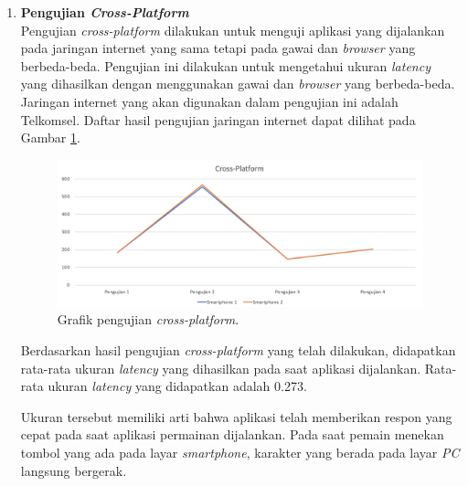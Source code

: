 \begin{enumerate}
	\item \textbf{Pengujian \textit{Cross-Platform}} \\
	Pengujian \textit{cross-platform} dilakukan untuk menguji aplikasi yang dijalankan pada jaringan internet yang sama tetapi pada gawai dan \textit{browser} yang berbeda-beda. Pengujian ini dilakukan untuk mengetahui ukuran \textit{latency} yang dihasilkan dengan menggunakan gawai dan \textit{browser} yang berbeda-beda. Jaringan internet yang akan digunakan dalam pengujian ini adalah Telkomsel. Daftar hasil pengujian jaringan internet dapat dilihat pada Gambar \ref{fig:pengujian_crossplatform}.
	
	\begin{figure}[H]
		\centering
		\includegraphics[scale=0.4]{Gambar/pengujian_crossplatform}
		\caption{Grafik pengujian \textit{cross-platform}.}
		\label{fig:pengujian_crossplatform}
	\end{figure}

	Berdasarkan hasil pengujian \textit{cross-platform} yang telah dilakukan, didapatkan rata-rata ukuran \textit{latency} yang dihasilkan pada saat aplikasi dijalankan. Rata-rata ukuran \textit{latency} yang didapatkan adalah 0.273.
	
	Ukuran tersebut memiliki arti bahwa aplikasi telah memberikan respon yang cepat pada saat aplikasi permainan dijalankan. Pada saat pemain menekan tombol yang ada pada layar \textit{smartphone}, karakter yang berada pada layar \textit{PC} langsung bergerak.
	

\end{enumerate}
